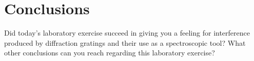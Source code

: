 \section{Conclusions}
Did today's laboratory exercise succeed in giving you a feeling for interference produced by diffraction gratings and their use as a spectroscopic tool?  What other conclusions can you reach regarding this laboratory exercise?

 
\endinput

